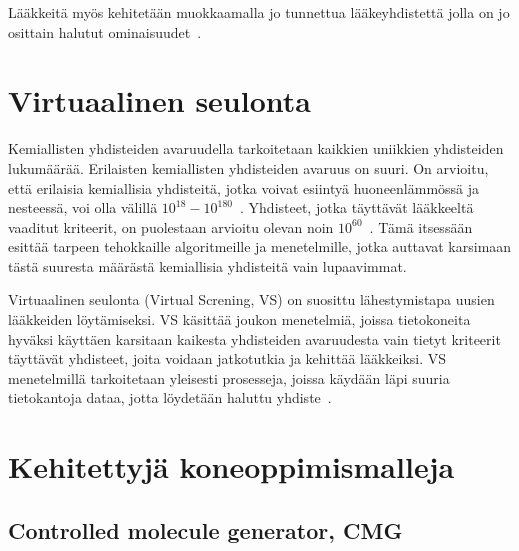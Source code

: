 \documentclass[finnish,twoside,censored,tkt,sw-line]{HYthesisML}
\begin{document}
Lääkkeitä myös kehitetään muokkaamalla jo tunnettua lääkeyhdistettä jolla on jo osittain halutut ominaisuudet~\cite{ShaharHarelAndKiraRadinsky}.


\section{Virtuaalinen seulonta}

Kemiallisten yhdisteiden avaruudella tarkoitetaan kaikkien uniikkien yhdisteiden lukumäärää.
Erilaisten kemiallisten yhdisteiden avaruus on suuri.
On arvioitu, että erilaisia kemiallisia yhdisteitä, jotka voivat esiintyä huoneenlämmössä ja nesteessä, voi olla välillä $10^{18} - 10^{180}$~\cite{SotrifferChristoph2011VSPC}.
Yhdisteet, jotka täyttävät lääkkeeltä vaaditut kriteerit, on puolestaan arvioitu olevan noin $10^{60}$~\cite{SotrifferChristoph2011VSPC}.
Tämä itsessään esittää tarpeen tehokkaille algoritmeille ja menetelmille, jotka auttavat karsimaan tästä suuresta määrästä kemiallisia yhdisteitä vain lupaavimmat.

Virtuaalinen seulonta (Virtual Screning, VS) on suosittu lähestymistapa uusien lääkkeiden löytämiseksi.
VS käsittää joukon menetelmiä, joissa tietokoneita hyväksi käyttäen karsitaan kaikesta yhdisteiden avaruudesta vain tietyt kriteerit täyttävät yhdisteet, joita voidaan jatkotutkia ja kehittää lääkkeiksi.
VS menetelmillä tarkoitetaan yleisesti prosesseja, joissa käydään läpi suuria tietokantoja dataa, jotta löydetään haluttu yhdiste~\cite{SotrifferChristoph2011VSPC}.



\section{Kehitettyjä koneoppimismalleja}


\subsection{Controlled molecule generator, CMG}
\end{document}
